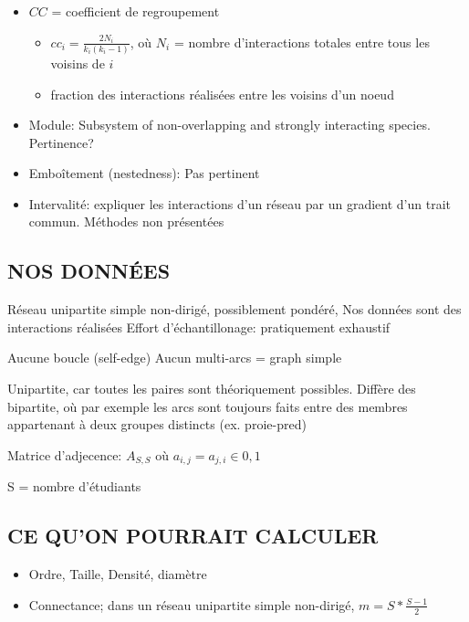 \documentclass[
]{article}
\providecommand{\tightlist}{%
  \setlength{\itemsep}{0pt}\setlength{\parskip}{0pt}}
\begin{document}
\begin{itemize}
\item
  \(CC\) = coefficient de regroupement

  \begin{itemize}
  \tightlist
  \item
    \(cc_i = \frac{2N_i}{k_i(k_i-1)}\), où \(N_i\) = nombre
    d'interactions totales entre tous les voisins de \(i\)
  \item
    fraction des interactions réalisées entre les voisins d'un noeud
  \end{itemize}
\item
  Module: Subsystem of non-overlapping and strongly interacting species.
  Pertinence?
\item
  Emboîtement (nestedness): Pas pertinent
\item
  Intervalité: expliquer les interactions d'un réseau par un gradient
  d'un trait commun. Méthodes non présentées
\end{itemize}

\hypertarget{nos-donnuxe9es}{%
\subsection{NOS DONNÉES}\label{nos-donnuxe9es}}

Réseau unipartite simple non-dirigé, possiblement pondéré, Nos données
sont des interactions réalisées Effort d'échantillonage: pratiquement
exhaustif

Aucune boucle (self-edge) Aucun multi-arcs = graph simple

Unipartite, car toutes les paires sont théoriquement possibles. Diffère
des bipartite, où par exemple les arcs sont toujours faits entre des
membres appartenant à deux groupes distincts (ex. proie-pred)

Matrice d'adjecence: \(A_{S,S}\) où \(a_{i,j} = a_{j,i} ∈ {0,1}\)

S = nombre d'étudiants

\hypertarget{ce-quon-pourrait-calculer}{%
\subsection{CE QU'ON POURRAIT
CALCULER}\label{ce-quon-pourrait-calculer}}

\begin{itemize}
\tightlist
\item
  Ordre, Taille, Densité, diamètre
\item
  Connectance; dans un réseau unipartite simple non-dirigé,
  \(m = S*\frac{S-1}{2}\)
\end{itemize}
\end{document}

